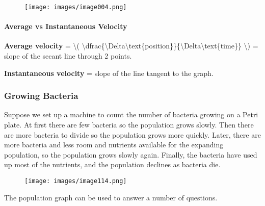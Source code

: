 \begin{figure}
\centering
\texttt{[image: images/image004.png]}
\caption{}
\end{figure}

\hypertarget{average-vs-instantaneous-velocity}{%
\paragraph{Average vs Instantaneous
Velocity}\label{average-vs-instantaneous-velocity}}

\textbf{Average velocity} = \textbackslash{}(
\textbackslash{}dfrac\{\textbackslash{}Delta\textbackslash{}text\{position\}\}\{\textbackslash{}Delta\textbackslash{}text\{time\}\}
\textbackslash{}) = slope of the secant line through 2 points.

\textbf{Instantaneous velocity} = slope of the line tangent to the
graph.

\hypertarget{growing-bacteria}{%
\subsubsection{Growing Bacteria}\label{growing-bacteria}}

Suppose we set up a machine to count the number of bacteria growing on a
Petri plate. At first there are few bacteria so the population grows
slowly. Then there are more bacteria to divide so the population grows
more quickly. Later, there are more bacteria and less room and nutrients
available for the expanding population, so the population grows slowly
again. Finally, the bacteria have used up most of the nutrients, and the
population declines as bacteria die.

\begin{figure}
\centering
\texttt{[image: images/image114.png]}
\caption{}
\end{figure}

The population graph can be used to answer a number of questions.

